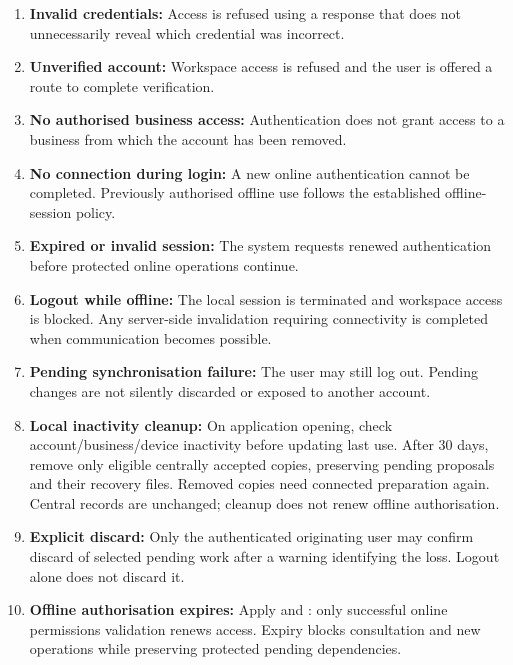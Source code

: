 \begin{enumerate}[label=A\arabic*.]
        \item \textbf{Invalid credentials:}
        Access is refused using a response that does not
        unnecessarily reveal which credential was incorrect.

        \item \textbf{Unverified account:}
        Workspace access is refused and the user is offered
        a route to complete verification.

        \item \textbf{No authorised business access:}
        Authentication does not grant access to a business
        from which the account has been removed.

        \item \textbf{No connection during login:}
        A new online authentication cannot be completed.
        Previously authorised offline use follows the
        established offline-session policy.

        \item \textbf{Expired or invalid session:}
        The system requests renewed authentication before
        protected online operations continue.

        \item \textbf{Logout while offline:}
        The local session is terminated and workspace access
        is blocked. Any server-side invalidation requiring
        connectivity is completed when communication
        becomes possible.

        \item \textbf{Pending synchronisation failure:}
        The user may still log out.
        Pending changes are not silently discarded or
        exposed to another account.

        \item \textbf{Local inactivity cleanup:} On application opening, check
        account/business/device inactivity before updating last use. After 30 days,
        remove only eligible centrally accepted copies, preserving pending proposals
        and their recovery files. Removed copies need connected preparation again.
        Central records are unchanged; cleanup does not renew offline authorisation.
        \item \textbf{Explicit discard:} Only the authenticated originating user may
        confirm discard of selected pending work after a warning identifying the
        loss. Logout alone does not discard it.
        \item \textbf{Offline authorisation expires:} Apply
        \hyperref[br:002]{} and \hyperref[fr:004]{}: only successful
        online permissions validation renews access. Expiry blocks consultation
        and new operations while preserving protected pending dependencies.
    \end{enumerate}

